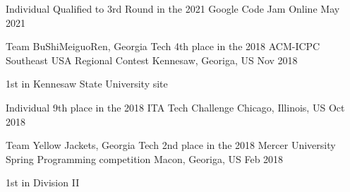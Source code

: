 









\begin{cventries}
	
	
\cventry
{Individual} %
{Qualified to 3rd Round in the 2021 Google Code Jam} %
{Online} %
{May 2021} %
{} %
	
	
\cventry
{Team BuShiMeiguoRen, Georgia Tech} %
{4th place in the 2018 ACM-ICPC Southeast USA Regional Contest} %
{Kennesaw, Georiga, US} %
{Nov 2018} %
{
\begin{cvitems}
	\item 1st in Kennesaw State University site
\end{cvitems}
} %
	

\cventry
{Individual} %
{9th place in the 2018 ITA Tech Challenge} %
{Chicago, Illinois, US} %
{Oct 2018} %
{} %


\cventry
{Team Yellow Jackets, Georgia Tech} %
{2nd place in the 2018 Mercer University Spring Programming competition} %
{Macon, Georiga, US} %
{Feb 2018} %
{
\begin{cvitems}
	\item 1st in Division II
\end{cvitems}
} %


\end{cventries}